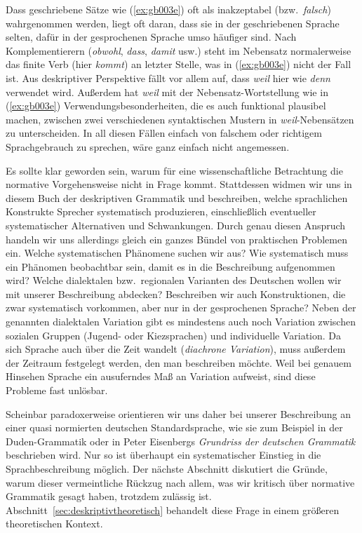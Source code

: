 Dass geschriebene Sätze wie (\ref{ex:gb003e}) oft als inakzeptabel (bzw.\ \textit{falsch}) wahrgenommen werden, liegt oft daran, dass sie in der geschriebenen Sprache selten, dafür in der gesprochenen Sprache umso häufiger sind.
Nach Komplementierern (\textit{obwohl}, \textit{dass}, \textit{damit} usw.) steht im Nebensatz normalerweise das finite Verb (hier \textit{kommt}) an letzter Stelle, was in (\ref{ex:gb003e}) nicht der Fall ist.
Aus deskriptiver Perspektive fällt vor allem auf, dass \textit{weil} hier wie \textit{denn} verwendet wird.
Außerdem hat \textit{weil} mit der Nebensatz-Wortstellung wie in (\ref{ex:gb003e}) Verwendungsbesonderheiten, die es auch funktional plausibel machen, zwischen zwei verschiedenen syntaktischen Mustern in \textit{weil}-Nebensätzen zu unterscheiden.
In all diesen Fällen einfach von falschem oder richtigem Sprachgebrauch zu sprechen, wäre ganz einfach nicht angemessen.

Es sollte klar geworden sein, warum für eine wissenschaftliche Betrachtung die normative Vorgehensweise nicht in Frage kommt.
Stattdessen widmen wir uns in diesem Buch der deskriptiven Grammatik und beschreiben, welche sprachlichen Konstrukte Sprecher systematisch produzieren, einschließlich eventueller systematischer Alternativen und Schwankungen.
Durch genau diesen Anspruch handeln wir uns allerdings gleich ein ganzes Bündel von praktischen Problemen ein.
Welche systematischen Phänomene suchen wir aus?
Wie systematisch muss ein Phänomen beobachtbar sein, damit es in die Beschreibung aufgenommen wird?
Welche dialektalen bzw.\ regionalen Varianten des Deutschen wollen wir mit unserer Beschreibung abdecken?
Beschreiben wir auch Konstruktionen, die zwar systematisch vorkommen, aber nur in der gesprochenen Sprache?
Neben der genannten dialektalen Variation gibt es mindestens auch noch Variation zwischen sozialen Gruppen (\zB Jugend- oder Kiezsprachen) und individuelle Variation.
Da sich Sprache auch über die Zeit wandelt (\textit{diachrone Variation}), muss außerdem der Zeitraum festgelegt werden, den man beschreiben möchte.
Weil bei genauem Hinsehen Sprache ein ausuferndes Maß an Variation aufweist, sind diese Probleme fast unlösbar.
 
Scheinbar paradoxerweise orientieren wir uns daher bei unserer Beschreibung an einer quasi normierten deutschen Standardsprache, wie sie zum Beispiel in der Duden-Grammatik oder in Peter Eisenbergs \textit{Grundriss der deutschen Grammatik} \citep{Eisenberg1,Eisenberg2} beschrieben wird.
Nur so ist überhaupt ein systematischer Einstieg in die Sprachbeschreibung möglich.
Der nächste Abschnitt diskutiert die Gründe, warum dieser vermeintliche Rückzug nach allem, was wir kritisch über normative Grammatik gesagt haben, trotzdem zulässig ist.
Abschnitt~\ref{sec:deskriptivtheoretisch} behandelt diese Frage in einem größeren theoretischen Kontext.


